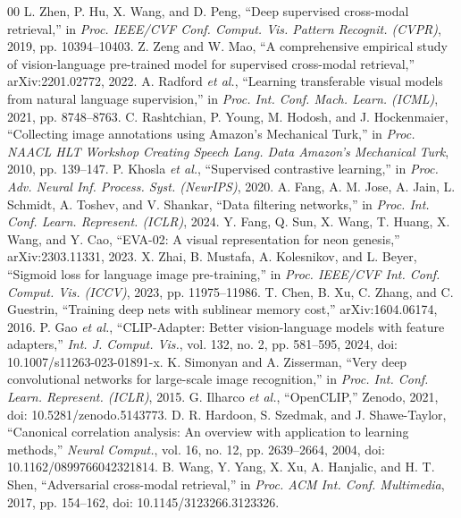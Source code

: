 \documentclass[conference]{IEEEtran}
\begin{document}
\begin{thebibliography}{00}
 L. Zhen, P. Hu, X. Wang, and D. Peng, ``Deep supervised cross-modal retrieval,'' in \textit{Proc. IEEE/CVF Conf. Comput. Vis. Pattern Recognit. (CVPR)}, 2019, pp. 10394--10403.
 Z. Zeng and W. Mao, ``A comprehensive empirical study of vision-language pre-trained model for supervised cross-modal retrieval,'' arXiv:2201.02772, 2022.
 A. Radford \textit{et al.}, ``Learning transferable visual models from natural language supervision,'' in \textit{Proc. Int. Conf. Mach. Learn. (ICML)}, 2021, pp. 8748--8763.
 C. Rashtchian, P. Young, M. Hodosh, and J. Hockenmaier, ``Collecting image annotations using Amazon's Mechanical Turk,'' in \textit{Proc. NAACL HLT Workshop Creating Speech Lang. Data Amazon's Mechanical Turk}, 2010, pp. 139--147.
 P. Khosla \textit{et al.}, ``Supervised contrastive learning,'' in \textit{Proc. Adv. Neural Inf. Process. Syst. (NeurIPS)}, 2020.
 A. Fang, A. M. Jose, A. Jain, L. Schmidt, A. Toshev, and V. Shankar, ``Data filtering networks,'' in \textit{Proc. Int. Conf. Learn. Represent. (ICLR)}, 2024.
 Y. Fang, Q. Sun, X. Wang, T. Huang, X. Wang, and Y. Cao, ``EVA-02: A visual representation for neon genesis,'' arXiv:2303.11331, 2023.
 X. Zhai, B. Mustafa, A. Kolesnikov, and L. Beyer, ``Sigmoid loss for language image pre-training,'' in \textit{Proc. IEEE/CVF Int. Conf. Comput. Vis. (ICCV)}, 2023, pp. 11975--11986.
 T. Chen, B. Xu, C. Zhang, and C. Guestrin, ``Training deep nets with sublinear memory cost,'' arXiv:1604.06174, 2016.
 P. Gao \textit{et al.}, ``CLIP-Adapter: Better vision-language models with feature adapters,'' \textit{Int. J. Comput. Vis.}, vol. 132, no. 2, pp. 581--595, 2024, doi: 10.1007/s11263-023-01891-x.
 K. Simonyan and A. Zisserman, ``Very deep convolutional networks for large-scale image recognition,'' in \textit{Proc. Int. Conf. Learn. Represent. (ICLR)}, 2015.
 G. Ilharco \textit{et al.}, ``OpenCLIP,'' Zenodo, 2021, doi: 10.5281/zenodo.5143773.
 D. R. Hardoon, S. Szedmak, and J. Shawe-Taylor, ``Canonical correlation analysis: An overview with application to learning methods,'' \textit{Neural Comput.}, vol. 16, no. 12, pp. 2639--2664, 2004, doi: 10.1162/0899766042321814.
 B. Wang, Y. Yang, X. Xu, A. Hanjalic, and H. T. Shen, ``Adversarial cross-modal retrieval,'' in \textit{Proc. ACM Int. Conf. Multimedia}, 2017, pp. 154--162, doi: 10.1145/3123266.3123326.

\end{thebibliography}
\end{document}
